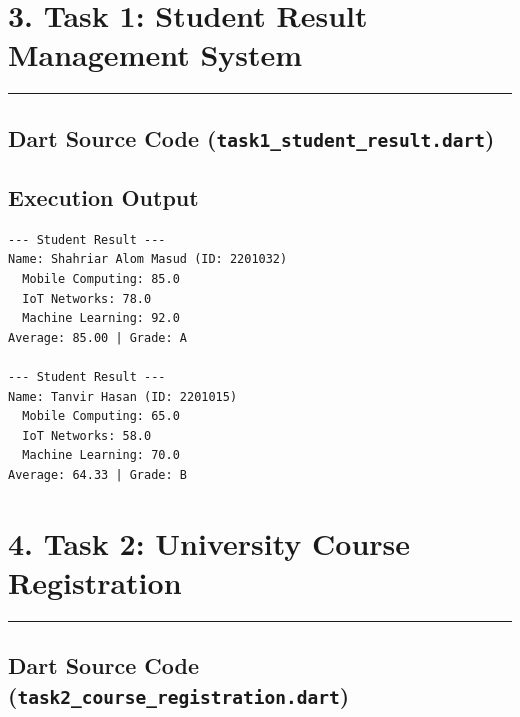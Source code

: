 \documentclass[11pt,a4paper]{article}
\begin{document}
\newpage

\section*{3. Task 1: Student Result Management System}
\noindent\rule{\textwidth}{0.5pt}\vspace{0.15cm}

\subsection*{Dart Source Code (\texttt{task1\_student\_result.dart})}


\vspace{0.2cm}
\subsection*{Execution Output}
\begin{lstlisting}[style=bashstyle]
--- Student Result ---
Name: Shahriar Alom Masud (ID: 2201032)
  Mobile Computing: 85.0
  IoT Networks: 78.0
  Machine Learning: 92.0
Average: 85.00 | Grade: A

--- Student Result ---
Name: Tanvir Hasan (ID: 2201015)
  Mobile Computing: 65.0
  IoT Networks: 58.0
  Machine Learning: 70.0
Average: 64.33 | Grade: B
\end{lstlisting}

\newpage

\section*{4. Task 2: University Course Registration}
\noindent\rule{\textwidth}{0.5pt}\vspace{0.15cm}

\subsection*{Dart Source Code (\texttt{task2\_course\_registration.dart})}

\end{document}

